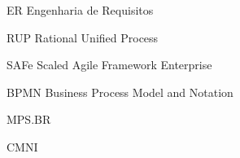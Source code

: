 \begin{siglas}
  \item[ER] Engenharia de Requisitos
  \item[RUP] Rational Unified Process
  \item[SAFe] Scaled Agile Framework Enterprise
  \item[BPMN] Business Process Model and Notation
  \item[MPS.BR]
  \item[CMNI]
\end{siglas}
